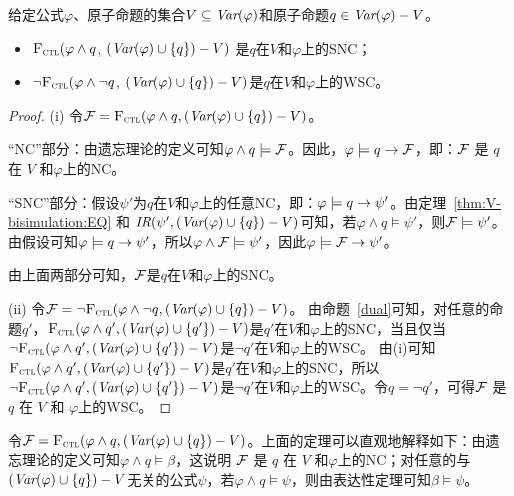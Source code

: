 \begin{theorem}\label{thm:SNC:WSC:forget}
	给定公式$\varphi$、原子命题的集合$V\subseteq\textit{Var}(\varphi)$和原子命题$q\in\textit{Var}(\varphi)- V$。
	\begin{itemize}
		\item[(i)] ${\textsc{F}_{\textsc{ctl}}} (\varphi \land q$, $(\textit{Var}(\varphi) \cup \{q\}) - V)$ 是$q$在$V$和$\varphi$上的SNC；
		\item[(ii)]  $\neg{\textsc{F}_{\textsc{ctl}}} (\varphi \land \neg q$, $(\textit{Var}(\varphi) \cup \{q\}) - V)$是$q$在$V$和$\varphi$上的WSC。
	\end{itemize}
\end{theorem}
\begin{proof}
	(i) 令${\cal F}={\textsc{F}_{\textsc{ctl}}}(\varphi \wedge q, (\textit{Var}(\varphi) \cup \{q\})- V)$。
	
	
	“NC”部分：由遗忘理论的定义可知$\varphi \wedge q \models {\cal F}$。因此，$\varphi\models q \rightarrow {\cal F}$，即：${\cal F}$ 是 $q$ 在 $V$ 和$\varphi$上的NC。
	
	“SNC”部分：假设$\psi'$为$q$在$V$和$\varphi$上的任意NC，即：$\varphi\models q \rightarrow \psi'$。由定理~\ref{thm:V-bisimulation:EQ} 和 $\emph{IR}(\psi', (\textit{Var}(\varphi) \cup \{q\})- V)$可知，若$\varphi \wedge q \models \psi'$，则${\cal F} \models \psi'$。
	由假设可知$\varphi\models q \rightarrow \psi'$，所以$\varphi \wedge {\cal F} \models \psi'$，因此$\varphi \models {\cal F} \rightarrow \psi'$。
	
	由上面两部分可知，${\cal F}$是$q$在$V$和$\varphi$上的SNC。
	
	(ii) 令${\cal F}=\neg {\textsc{F}_{\textsc{ctl}}}(\varphi \wedge \neg q, (\textit{Var}(\varphi) \cup \{q\})- V)$。
	由命题~\ref{dual}可知，对任意的命题$q'$，${\textsc{F}_{\textsc{ctl}}}(\varphi \wedge q', (\textit{Var}(\varphi) \cup \{q'\})- V)$是$q'$在$V$和$\varphi$上的SNC，当且仅当
	$\neg {\textsc{F}_{\textsc{ctl}}}(\varphi \wedge q', (\textit{Var}(\varphi) \cup \{q'\})- V)$是$\neg q'$在$V$和$\varphi$上的WSC。
	由(i)可知${\textsc{F}_{\textsc{ctl}}}(\varphi \wedge q', (\textit{Var}(\varphi) \cup \{q'\})- V)$是$q'$在$V$和$\varphi$上的SNC，所以$\neg {\textsc{F}_{\textsc{ctl}}}(\varphi \wedge q', (\textit{Var}(\varphi) \cup \{q'\})- V)$是$\neg q'$在$V$和$\varphi$上的WSC。令$q=\neg q'$，可得${\cal F}$ 是 $q$ 在 $V$ 和 $\varphi$上的WSC。
\end{proof}

令${\cal F}={\textsc{F}_{\textsc{ctl}}}(\varphi \wedge q, (\textit{Var}(\varphi) \cup \{q\})- V)$。上面的定理可以直观地解释如下：由遗忘理论的定义可知$\varphi \wedge q \models \beta$，这说明
${\cal F}$ 是 $q$ 在 $V$ 和$\varphi$上的NC；对任意的与$(\textit{Var}(\varphi) \cup \{q\})- V$无关的公式$\psi$，若$\varphi \wedge q \models \psi$，则由表达性定理可知$\beta \models \psi$。

